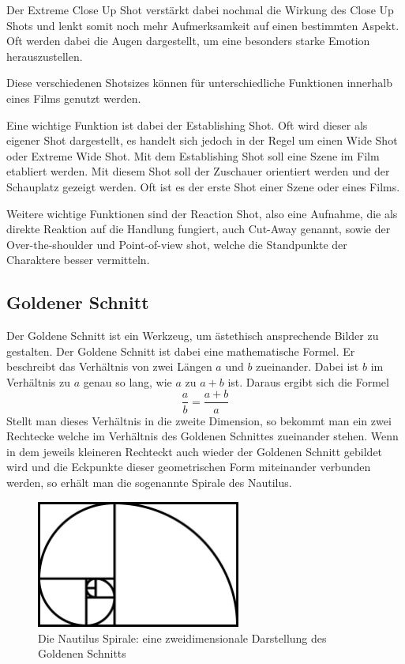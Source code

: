 Der Extreme Close Up Shot verstärkt dabei nochmal die Wirkung des Close Up Shots und lenkt somit noch mehr Aufmerksamkeit auf einen bestimmten Aspekt. Oft werden dabei die Augen dargestellt, um eine besonders starke Emotion herauszustellen.

Diese verschiedenen Shotsizes können für unterschiedliche Funktionen innerhalb eines Films genutzt werden.\autocite{Studiobinder.2020}

Eine wichtige Funktion ist dabei der Establishing Shot. Oft wird dieser als eigener Shot dargestellt, es handelt sich jedoch in der Regel um einen Wide Shot oder Extreme Wide Shot. Mit dem Establishing Shot soll eine Szene im Film etabliert werden. Mit diesem Shot soll der Zuschauer orientiert werden und der Schauplatz gezeigt werden. Oft ist es der erste Shot einer Szene oder eines Films.

Weitere wichtige Funktionen sind der Reaction Shot, also eine Aufnahme, die als direkte Reaktion auf die Handlung fungiert, auch Cut-Away genannt, sowie der Over-the-shoulder und Point-of-view shot, welche die Standpunkte der Charaktere besser vermitteln.
\subsection{Goldener Schnitt}
Der Goldene Schnitt ist ein Werkzeug, um ästethisch ansprechende Bilder zu gestalten.\autocite{Bruchwitz.2017}
Der Goldene Schnitt ist dabei eine mathematische Formel. Er beschreibt das Verhältnis von zwei Längen $a$ und $b$ zueinander. Dabei ist $b$ im Verhältnis zu $a$ genau so lang, wie $a$ zu $a + b$ ist. Daraus ergibt sich die Formel
\begin{equation}
    \frac{a}{b} = \frac{a+b}{a}
\end{equation}
Stellt man dieses Verhältnis in die zweite Dimension, so bekommt man ein zwei Rechtecke welche im Verhältnis des Goldenen Schnittes zueinander stehen. Wenn in dem jeweils kleineren Rechteckt auch wieder der Goldenen Schnitt gebildet wird und die Eckpunkte dieser geometrischen Form miteinander verbunden werden, so erhält man die sogenannte Spirale des Nautilus.

\begin{figure}[h]
    \centering
    \includegraphics[width=0.6\textwidth]{img/AO_GoldenerSchnitt.jpg}
    \caption[Imagefilm: Der Goldene Schnitt]{Die Nautilus Spirale: eine zweidimensionale Darstellung des Goldenen Schnitts}
    \label{fig:AO_GoldenerSchnitt}
\end{figure}

